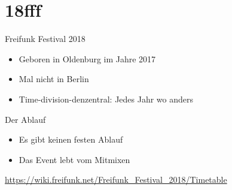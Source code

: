 \section{18fff}

\begin{frame}{Freifunk Festival 2018}
    \begin{itemize}
        \item Geboren in Oldenburg im Jahre 2017
        \item Mal nicht in Berlin
        \item Time-division-denzentral: Jedes Jahr wo anders
    \end{itemize}
\end{frame}

\begin{frame}{Der Ablauf}
    \begin{itemize}
        \item Es gibt keinen festen Ablauf
        \item Das Event lebt vom Mitmixen
    \end{itemize}
    \url{https://wiki.freifunk.net/Freifunk\_Festival\_2018/Timetable}
\end{frame}

